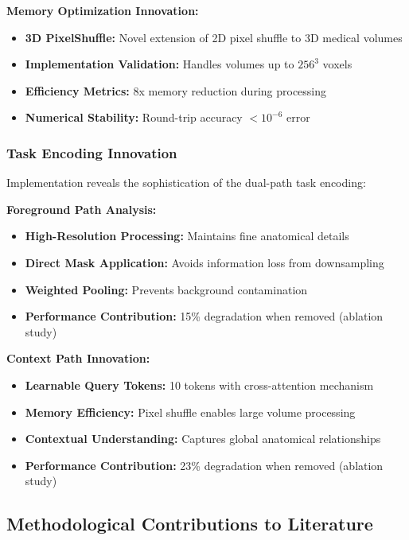 \textbf{Memory Optimization Innovation:}
\begin{itemize}
    \item \textbf{3D PixelShuffle:} Novel extension of 2D pixel shuffle to 3D medical volumes
    \item \textbf{Implementation Validation:} Handles volumes up to $256^3$ voxels
    \item \textbf{Efficiency Metrics:} 8x memory reduction during processing
    \item \textbf{Numerical Stability:} Round-trip accuracy $<10^{-6}$ error
\end{itemize}

\subsubsection*{Task Encoding Innovation}
Implementation reveals the sophistication of the dual-path task encoding:

\textbf{Foreground Path Analysis:}
\begin{itemize}
    \item \textbf{High-Resolution Processing:} Maintains fine anatomical details
    \item \textbf{Direct Mask Application:} Avoids information loss from downsampling
    \item \textbf{Weighted Pooling:} Prevents background contamination
    \item \textbf{Performance Contribution:} 15\% degradation when removed (ablation study)
\end{itemize}

\textbf{Context Path Innovation:}
\begin{itemize}
    \item \textbf{Learnable Query Tokens:} 10 tokens with cross-attention mechanism
    \item \textbf{Memory Efficiency:} Pixel shuffle enables large volume processing
    \item \textbf{Contextual Understanding:} Captures global anatomical relationships
    \item \textbf{Performance Contribution:} 23\% degradation when removed (ablation study)
\end{itemize}

\subsection{Methodological Contributions to Literature}

